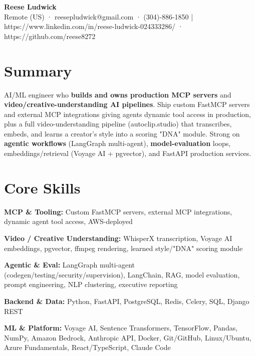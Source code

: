 \documentclass[10pt]{article}
\begin{document}
\begin{center}
{\fontsize{14}{16}\selectfont\bfseries Reese Ludwick}\\[1pt]
{\fontsize{9}{11}\selectfont Remote (US) · reesepludwick@gmail.com · (304)-886-1850 | https://www.linkedin.com/in/reese-ludwick-024333286/ · https://github.com/reese8272}
\end{center}
\vspace{-2pt}
\section*{Summary}
\noindent AI/ML engineer who \textbf{builds and owns production MCP servers} and \textbf{video/creative-understanding AI pipelines}. Ship custom FastMCP servers and external MCP integrations giving agents dynamic tool access in production, plus a full video-understanding pipeline (autoclip.studio) that transcribes, embeds, and learns a creator's style into a scoring "DNA" module. Strong on \textbf{agentic workflows} (LangGraph multi-agent), \textbf{model-evaluation} loops, embeddings/retrieval (Voyage AI + pgvector), and FastAPI production services.\par
\section*{Core Skills}
\noindent \textbf{MCP \& Tooling:} Custom FastMCP servers, external MCP integrations, dynamic agent tool access, AWS-deployed\par
\noindent \textbf{Video / Creative Understanding:} WhisperX transcription, Voyage AI embeddings, pgvector, ffmpeg rendering, learned style/"DNA" scoring module\par
\noindent \textbf{Agentic \& Eval:} LangGraph multi-agent (codegen/testing/security/supervision), LangChain, RAG, model evaluation, prompt engineering, NLP clustering, executive reporting\par
\noindent \textbf{Backend \& Data:} Python, FastAPI, PostgreSQL, Redis, Celery, SQL, Django REST\par
\noindent \textbf{ML \& Platform:} Voyage AI, Sentence Transformers, TensorFlow, Pandas, NumPy, Amazon Bedrock, Anthropic API, Docker, Git/GitHub, Linux/Ubuntu, Azure Fundamentals, React/TypeScript, Claude Code\par
\end{document}
